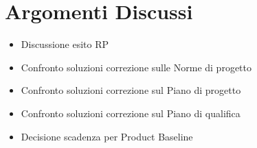 \section{Argomenti Discussi}
	\begin{itemize}
		\item Discussione esito RP
		\item Confronto soluzioni correzione sulle Norme di progetto
		\item Confronto soluzioni correzione sul Piano di progetto
		\item Confronto soluzioni correzione sul Piano di qualifica
		\item Decisione scadenza per Product Baseline
	\end{itemize}

